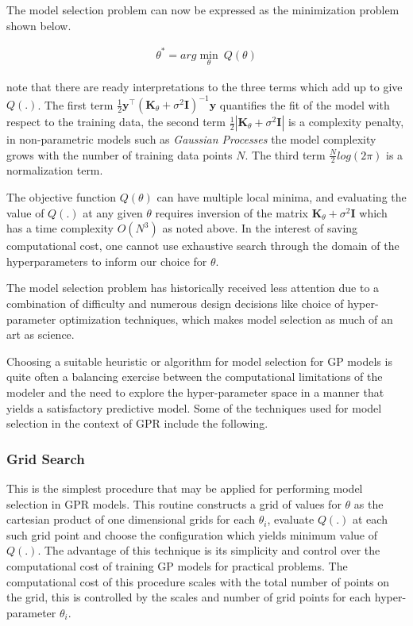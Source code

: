 \documentclass{article}
\begin{document}
The model selection problem can now be expressed as the minimization problem shown below.

\begin{align*}
  \theta^* = arg\min_{\theta} \ Q(\theta)
\end{align*}

\citet{Rasmussen:2005:GPM:1162254} note that there are ready interpretations to the three terms which add up to give $Q(.)$. The first term $\frac{1}{2} \mathbf{y}^\intercal (\mathbf{K}_\theta + \sigma^{2} \mathbf{I})^{-1} \mathbf{y}$ quantifies the fit of the model with respect to the training data, the second term $\frac{1}{2}|\mathbf{K}_\theta + \sigma^{2} \mathbf{I}|$ is a complexity penalty, in non-parametric models such as \emph{Gaussian Processes} the model complexity grows with the number of training data points $N$. The third term $\frac{N}{2}log(2\pi)$ is a normalization term.

The objective function $Q(\theta)$ can have multiple local minima, and evaluating the value of $Q(.)$ at any given $\theta$ requires inversion of the matrix $\mathbf{K}_\theta + \sigma^{2} \mathbf{I}$ which has a time complexity $O(N^3)$ as noted above. In the interest of saving computational cost, one cannot use exhaustive search through the domain of the hyperparameters to inform our choice for $\theta$.

The model selection problem has historically received less attention
due to a combination of difficulty and numerous design decisions like
choice of hyper-parameter optimization techniques, which makes model
selection as much of an art as science. 

Choosing a suitable heuristic or algorithm for model selection for GP
models is quite often a balancing exercise between the computational
limitations of the modeler and the need to explore the hyper-parameter
space in a manner that yields a satisfactory predictive model. Some of
the techniques used for model selection in the context of GPR include
the following.


\subsubsection*{Grid Search}

This is the simplest procedure that may be applied for performing model selection in GPR models. This routine constructs a grid of values for $\theta$ as the cartesian product of one dimensional grids for each $\theta_i$, evaluate $Q(.)$ at each such grid point and choose the configuration which yields minimum value of $Q(.)$. The advantage of this technique is its simplicity and control over the computational cost of training GP models for practical problems. The computational cost of this procedure scales with the total number of points on the grid, this is controlled by the scales and number of grid points for each hyper-parameter $\theta_i$.
\end{document}
